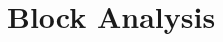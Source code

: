 \documentclass[USenglish]{uit-thesis}
\begin{document}
\section{Block Analysis}
\label{sec:block_analysis}
%
\end{document}
